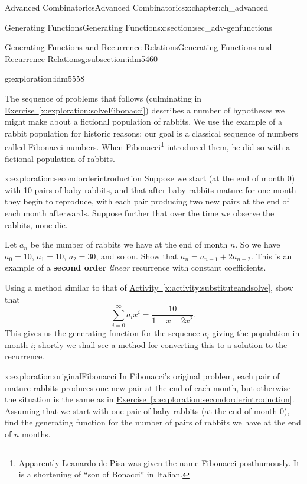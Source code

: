 \documentclass[oneside,10pt,]{book}
\newcommand{\terminology}[1]{\textbf{#1}}
\numberwithin{equation}{chapter}
\begin{document}
\begin{chapterptx}{Advanced Combinatorics}{}{Advanced Combinatorics}{}{}{x:chapter:ch_advanced}
\begin{sectionptx}{Generating Functions}{}{Generating Functions}{}{}{x:section:sec_adv-genfunctions}
\begin{subsectionptx}{Generating Functions and Recurrence Relations}{}{Generating Functions and Recurrence Relations}{}{}{g:subsection:idm5460}
\begin{exploration}{}{g:exploration:idm5558}
\end{exploration}
The sequence of problems that follows (culminating in \hyperref[x:exploration:solveFibonacci]{Exercise~\ref{x:exploration:solveFibonacci}}) describes a number of hypotheses we might make about a fictional population of rabbits. We use the example of a rabbit population for historic reasons; our goal is a classical sequence of numbers called Fibonacci numbers. When Fibonacci\footnote{Apparently Leanardo de Pisa was given the name Fibonacci posthumously. It is a shortening of ``son of Bonacci'' in Italian.\label{g:fn:idm5578}} introduced them, he did so with a fictional population of rabbits.%
\begin{exploration}{}{x:exploration:secondorderintroduction}%
Suppose we start (at the end of month 0) with 10 pairs of baby rabbits, and that after baby rabbits mature for one month they begin to reproduce, with each pair producing two new pairs at the end of each month afterwards. Suppose further that over the time we observe the rabbits, none die.%
\par
Let \(a_n\) be the number of rabbits we have at the end of month \(n\). So we have \(a_0 = 10\), \(a_1 = 10\), \(a_2 = 30\), and so on.  Show that \(a_n=a_{n-1} + 2a_{n-2}\). This is an example of a \terminology{second order} \emph{linear} recurrence with constant coefficients.%
\par
Using a method similar to that of \hyperref[x:activity:substituteandsolve]{Activity~\ref{x:activity:substituteandsolve}}, show that%
\begin{equation*}
\sum_{i=0}^\infty a_ix^i = \frac{10}{1-x-2x^2}.
\end{equation*}
This gives us the generating function for the sequence \(a_i\) giving the population in month \(i\); shortly we shall see a method for converting this to a solution to the recurrence.%
\end{exploration}
\begin{exploration}{}{x:exploration:originalFibonacci}%
In Fibonacci's original problem, each pair of mature rabbits produces one new pair at the end of each month, but otherwise the situation is the same as in \hyperref[x:exploration:secondorderintroduction]{Exercise~\ref{x:exploration:secondorderintroduction}}.  Assuming that we start with one pair of baby rabbits (at the end of month 0), find the generating function for the number of pairs of rabbits we have at the end of \(n\) months.%

\end{exploration}
\end{subsectionptx}
\end{sectionptx}
\end{chapterptx}
\end{document}
